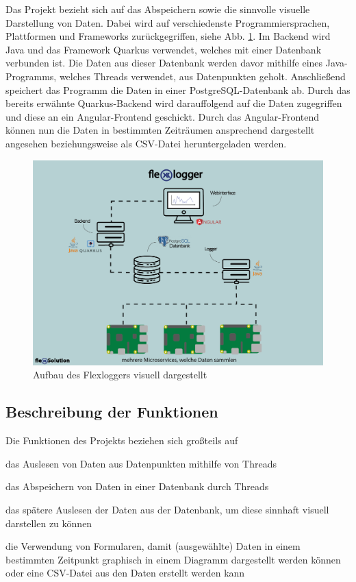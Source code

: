 Das Projekt bezieht sich auf das Abspeichern sowie die sinnvolle visuelle Darstellung von Daten. Dabei wird auf verschiedenste Programmiersprachen, Plattformen und Frameworks zurückgegriffen, siehe Abb. \ref{fig:impl:FlexLoggerAufbau}.
Im Backend wird Java und das Framework Quarkus verwendet, welches mit einer Datenbank verbunden ist. Die Daten aus dieser Datenbank werden davor mithilfe eines Java-Programms, welches Threads verwendet, aus Datenpunkten geholt. Anschließend speichert das Programm die Daten in einer PostgreSQL-Datenbank ab. Durch das bereits erwähnte Quarkus-Backend wird darauffolgend auf die Daten zugegriffen und diese an ein Angular-Frontend geschickt. Durch das Angular-Frontend können nun die Daten in bestimmten Zeiträumen ansprechend dargestellt angesehen beziehungsweise als CSV-Datei heruntergeladen werden.


\begin{figure}
\centering
\includegraphics[scale=0.7]{pics/webinertface2.png}
\caption{Aufbau des Flexloggers visuell dargestellt}
\label{fig:impl:FlexLoggerAufbau}
\end{figure}


\subsection{Beschreibung der Funktionen}
Die Funktionen des Projekts beziehen sich großteils auf
\begin{compactitem}
\item das Auslesen von Daten aus Datenpunkten mithilfe von Threads
\item das Abspeichern von Daten in einer Datenbank durch Threads
\item das spätere Auslesen der Daten aus der Datenbank, um diese sinnhaft visuell darstellen zu können
\item die Verwendung von Formularen, damit (ausgewählte) Daten in einem bestimmten Zeitpunkt graphisch in einem Diagramm dargestellt werden können oder eine CSV-Datei aus den Daten erstellt werden kann
\end{compactitem}



